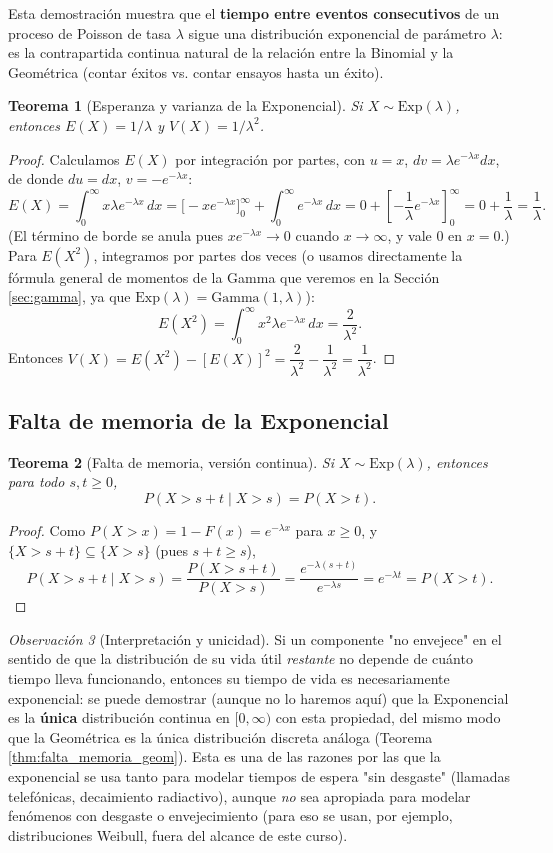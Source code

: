 \documentclass[11pt,a4paper]{article}
\theoremstyle{plain}
\newtheorem{teorema}{Teorema}[section]
\theoremstyle{definition}
\theoremstyle{remark}
\newtheorem{observacion}[teorema]{Observación}
\begin{document}
Esta demostración muestra que el \textbf{tiempo entre eventos consecutivos} de un proceso de Poisson de tasa $\lambda$ sigue una distribución exponencial de parámetro $\lambda$: es la contrapartida continua natural de la relación entre la Binomial y la Geométrica (contar éxitos vs. contar ensayos hasta un éxito).

\begin{teorema}[Esperanza y varianza de la Exponencial]
Si $X\sim\text{Exp}(\lambda)$, entonces $E(X)=1/\lambda$ y $V(X)=1/\lambda^2$.
\end{teorema}
\begin{proof}
Calculamos $E(X)$ por integración por partes, con $u=x$, $dv=\lambda e^{-\lambda x}dx$, de donde $du=dx$, $v=-e^{-\lambda x}$:
$$E(X)=\int_0^\infty x\lambda e^{-\lambda x}\,dx=\big[-xe^{-\lambda x}\big]_0^\infty+\int_0^\infty e^{-\lambda x}\,dx=0+\left[-\frac{1}{\lambda}e^{-\lambda x}\right]_0^\infty=0+\frac{1}{\lambda}=\frac1\lambda.$$
(El término de borde se anula pues $xe^{-\lambda x}\to0$ cuando $x\to\infty$, y vale $0$ en $x=0$.) Para $E(X^2)$, integramos por partes dos veces (o usamos directamente la fórmula general de momentos de la Gamma que veremos en la Sección \ref{sec:gamma}, ya que $\text{Exp}(\lambda)=\text{Gamma}(1,\lambda)$):
$$E(X^2)=\int_0^\infty x^2\lambda e^{-\lambda x}\,dx=\frac{2}{\lambda^2}.$$
Entonces $V(X)=E(X^2)-[E(X)]^2=\dfrac{2}{\lambda^2}-\dfrac{1}{\lambda^2}=\dfrac{1}{\lambda^2}$.
\end{proof}

\subsection{Falta de memoria de la Exponencial}

\begin{teorema}[Falta de memoria, versión continua]
Si $X\sim\text{Exp}(\lambda)$, entonces para todo $s,t\ge0$,
$$P(X>s+t\mid X>s)=P(X>t).$$
\end{teorema}
\begin{proof}
Como $P(X>x)=1-F(x)=e^{-\lambda x}$ para $x\ge0$, y $\{X>s+t\}\subseteq\{X>s\}$ (pues $s+t\ge s$),
$$P(X>s+t\mid X>s)=\frac{P(X>s+t)}{P(X>s)}=\frac{e^{-\lambda(s+t)}}{e^{-\lambda s}}=e^{-\lambda t}=P(X>t).$$
\end{proof}

\begin{observacion}[Interpretación y unicidad]
Si un componente "no envejece" en el sentido de que la distribución de su vida útil \emph{restante} no depende de cuánto tiempo lleva funcionando, entonces su tiempo de vida es necesariamente exponencial: se puede demostrar (aunque no lo haremos aquí) que la Exponencial es la \textbf{única} distribución continua en $[0,\infty)$ con esta propiedad, del mismo modo que la Geométrica es la única distribución discreta análoga (Teorema \ref{thm:falta_memoria_geom}). Esta es una de las razones por las que la exponencial se usa tanto para modelar tiempos de espera "sin desgaste" (llamadas telefónicas, decaimiento radiactivo), aunque \emph{no} sea apropiada para modelar fenómenos con desgaste o envejecimiento (para eso se usan, por ejemplo, distribuciones Weibull, fuera del alcance de este curso).
\end{observacion}
\end{document}
